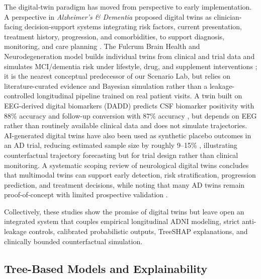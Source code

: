 \documentclass[11pt,a4paper]{article}
\begin{document}
The digital-twin paradigm has moved from perspective to early implementation. A perspective in \textit{Alzheimer's \& Dementia} proposed digital twins as clinician-facing decision-support systems integrating risk factors, current presentation, treatment history, progression, and comorbidities, to support diagnosis, monitoring, and care planning \cite{dt2022perspective}. The Fulcrum Brain Health and Neurodegeneration model builds individual twins from clinical and trial data and simulates MCI/dementia risk under lifestyle, drug, and supplement interventions \cite{fulcrum2025}; it is the nearest conceptual predecessor of our Scenario Lab, but relies on literature-curated evidence and Bayesian simulation rather than a leakage-controlled longitudinal pipeline trained on real patient visits. A twin built on EEG-derived digital biomarkers (DADD) predicts CSF biomarker positivity with 88\% accuracy and follow-up conversion with 87\% accuracy \cite{dadd2025}, but depends on EEG rather than routinely available clinical data and does not simulate trajectories. AI-generated digital twins have also been used as synthetic placebo outcomes in an AD trial, reducing estimated sample size by roughly 9--15\% \cite{trialtwins2025}, illustrating counterfactual trajectory forecasting but for trial design rather than clinical monitoring. A systematic scoping review of neurological digital twins concludes that multimodal twins can support early detection, risk stratification, progression prediction, and treatment decisions, while noting that many AD twins remain proof-of-concept with limited prospective validation \cite{bel2026dtreview}.

Collectively, these studies show the promise of digital twins but leave open an integrated system that couples empirical longitudinal ADNI modeling, strict anti-leakage controls, calibrated probabilistic outputs, TreeSHAP explanations, and clinically bounded counterfactual simulation.

\subsection{Tree-Based Models and Explainability}
\label{subsec:rw_trees}
\end{document}
